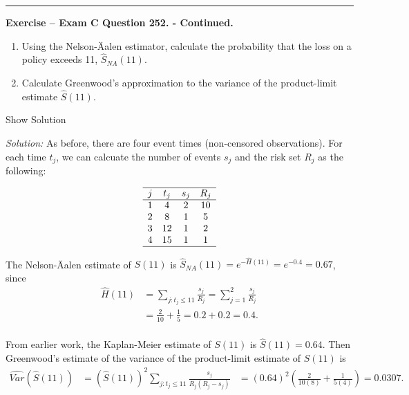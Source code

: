 \documentclass[]{book}
\providecommand{\tightlist}{%
  \setlength{\itemsep}{0pt}\setlength{\parskip}{0pt}}
\theoremstyle{definition}
\theoremstyle{definition}
\theoremstyle{definition}
\theoremstyle{remark}
\begin{document}
\begin{center}\rule{0.5\linewidth}{\linethickness}\end{center}

\textbf{Exercise -- Exam C Question 252. - Continued.}

\begin{enumerate}
\def\labelenumi{\alph{enumi})}
\tightlist
\item
  Using the Nelson-Äalen estimator, calculate the probability that the
  loss on a policy exceeds 11, \(\hat{S}_{NA}(11)\).
\item
  Calculate Greenwood's approximation to the variance of the
  product-limit estimate \(\hat{S}(11)\).
\end{enumerate}

Show Solution

\hypertarget{toggleExamC252a}{}
\emph{Solution:} As before, there are four event times (non-censored
observations). For each time \(t_j\), we can calcuate the number of
events \(s_j\) and the risk set \(R_j\) as the following:

\[\begin{array}{cccc}
\hline
j & t_j & s_j & R_j \\
\hline
1 & 4 & 2 & 10 \\
2 & 8 & 1 & 5 \\
3 & 12 & 1 & 2 \\
4 & 15 & 1 & 1 \\
\hline
\end{array}\]

The Nelson-Äalen estimate of \(S(11)\) is
\(\hat{S}_{NA}(11)=e^{-\hat{H}(11)} = e^{-0.4} = 0.67\), since
\[\begin{aligned}
\hat{H}(11) &= \sum_{j:t_j\leq 11} \frac{s_j}{R_j}  = \sum_{j=1}^{2} \frac{s_j}{R_j}  \\
&= \frac{2}{10} + \frac{1}{5}  = 0.2 + 0.2 = 0.4 .\\
\end{aligned}\]

From earlier work, the Kaplan-Meier estimate of \(S(11)\) is
\(\hat{S}(11) = 0.64\). Then Greenwood's estimate of the variance of the
product-limit estimate of \(S(11)\) is \[\begin{aligned}
\widehat{Var}(\hat{S}(11)) &= (\hat{S}(11))^2 \sum_{j:t_j\leq 11} \frac{s_j}{R_j(R_j-s_j)} 
&= (0.64)^2 \left(\frac{2}{10(8)} + \frac{1}{5(4)} \right)  = 0.0307. \\
\end{aligned}\]
\end{document}
